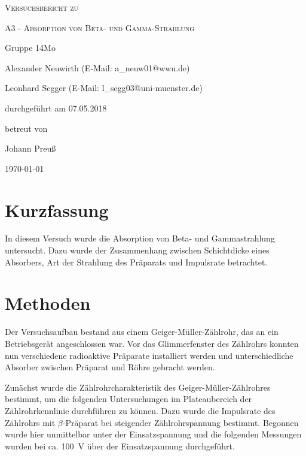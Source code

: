 \documentclass[
	a4paper,
	12pt,
	pagesize,
	ngerman
]{scrartcl}
\begin{document}
	
	\begin{titlepage}
		\centering
		{\scshape\LARGE Versuchsbericht zu \par}
		\vspace{1cm}
		{\scshape\huge A3 - Absorption von Beta- und Gamma-Strahlung \par}
		\vspace{2.5cm}
		{\LARGE Gruppe 14Mo \par}
		\vspace{0.5cm}
		
		{\large Alexander Neuwirth (E-Mail: a\_neuw01@wwu.de) \par}
		{\large Leonhard Segger (E-Mail: l\_segg03@uni-muenster.de) \par}
		\vfill
		
		durchgeführt am 07.05.2018\par
		betreut von\par
		{\large Johann Preuß}  
		
		\vfill
		
		{\large \today\par}
	\end{titlepage}
	\tableofcontents
	\newpage

	\section{Kurzfassung}
	In diesem Versuch wurde die Absorption von Beta- und Gammastrahlung untersucht. %
	Dazu wurde der Zusammenhang zwischen Schichtdicke eines Absorbers, Art der Strahlung des Präparats und Impulsrate betrachtet.
	
	\section{Methoden}\label{Methoden}
	Der Versuchsaufbau bestand aus einem Geiger-Müller-Zählrohr, das an ein Betriebsgerät angeschlossen war.
	Vor das Glimmerfenster des Zählrohrs konnten nun verschiedene radioaktive Präparate installiert werden und unterschiedliche Absorber zwischen Präparat und Röhre gebracht werden.
	
	Zunächst wurde die Zählrohrcharakteristik des Geiger-Müller-Zählrohres bestimmt, um die folgenden Untersuchungen im Plateaubereich der Zählrohrkennlinie durchführen zu können.
	Dazu wurde die Impulsrate des Zählrohrs mit $\beta$-Präparat bei steigender Zählrohrspannung bestimmt.
	Begonnen wurde hier unmittelbar unter der Einsatzspannung und die folgenden Messungen wurden bei ca. \SI{100}{\volt} über der Einsatzspannung durchgeführt.
	
\end{document}
